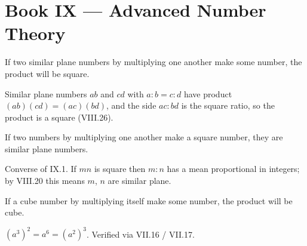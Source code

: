 %
%

\section{Book IX --- Advanced Number Theory}
\label{sec:book-IX}

\begin{claim}
\label{prop:IX.1}
If two similar plane numbers by multiplying one another make some
number, the product will be square.
\end{claim}
\begin{evidence}[Proof of IX.1]
\label{ev:IX.1}
Similar plane numbers $ab$ and $cd$ with $a:b = c:d$ have product
$(ab)(cd) = (ac)(bd)$, and the side $ac : bd$ is the square ratio,
so the product is a square (VIII.26).
\end{evidence}

\begin{claim}
\label{prop:IX.2}
If two numbers by multiplying one another make a square number, they
are similar plane numbers.
\end{claim}
\begin{evidence}[Proof of IX.2]
\label{ev:IX.2}
Converse of IX.1.  If $mn$ is square then $m : n$ has a mean
proportional in integers; by VIII.20 this means $m$, $n$ are similar
plane.
\end{evidence}

\begin{claim}
\label{prop:IX.3}
If a cube number by multiplying itself make some number, the product
will be cube.
\end{claim}
\begin{evidence}[Proof of IX.3]
\label{ev:IX.3}
$(a^3)^2 = a^6 = (a^2)^3$.  Verified via VII.16 / VII.17.
\end{evidence}

